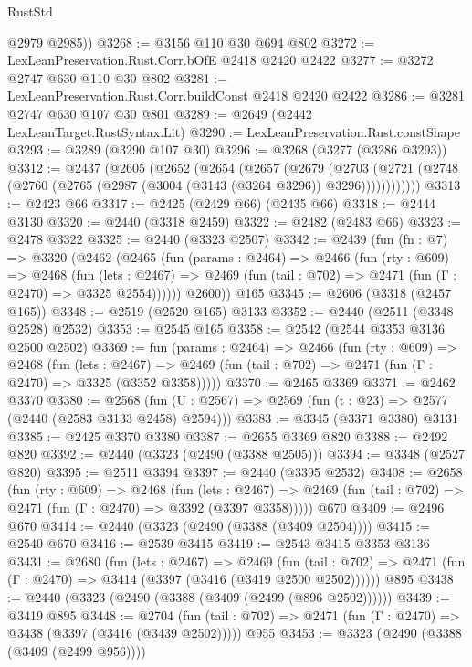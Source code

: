 \begin{lexlean}{RustStd}
\begin{coremodule}
{\begin{coremodule}
{{{{{{{{{{{{        @2979
        @2985))
@3268 := @3156 @110 @30 @694 @802
@3272 := LexLeanPreservation.Rust.Corr.bOfE @2418 @2420 @2422
@3277 := @3272 @2747 @630 @110 @30 @802
@3281 := LexLeanPreservation.Rust.Corr.buildConst @2418 @2420 @2422
@3286 := @3281 @2747 @630 @107 @30 @801
@3289 := @2649 (@2442 LexLeanTarget.RustSyntax.Lit)
@3290 := LexLeanPreservation.Rust.constShape
@3293 := @3289 (@3290 @107 @30)
@3296 := @3268 (@3277 (@3286 @3293))
@3312 := @2437
    (@2605
      (@2652
        (@2654
          (@2657
            (@2679
              (@2703
                (@2721 (@2748 (@2760 (@2765 (@2987 (@3004 (@3143 (@3264 @3296)) @3296))))))))))))
@3313 := @2423 @66
@3317 := @2425 (@2429 @66) (@2435 @66)
@3318 := @2444 @3130
@3320 := @2440 (@3318 @2459)
@3322 := @2482 (@2483 @66)
@3323 := @2478 @3322
@3325 := @2440 (@3323 @2507)
@3342 := @2439
    (fun (fn : @7) =>
    @3320
      (@2462
        (@2465
          (fun (params : @2464) =>
          @2466
            (fun (rty : @609) =>
            @2468
              (fun (lets : @2467) =>
              @2469 (fun (tail : @702) => @2471 (fun (Γ : @2470) => @3325 @2554))))))
        @2600))
    @165
@3345 := @2606 (@3318 (@2457 @165))
@3348 := @2519 (@2520 @165) @3133
@3352 := @2440 (@2511 (@3348 @2528) @2532)
@3353 := @2545 @165
@3358 := @2542 (@2544 @3353 @3136 @2500 @2502)
@3369 := fun (params : @2464) =>
  @2466
    (fun (rty : @609) =>
    @2468
      (fun (lets : @2467) =>
      @2469 (fun (tail : @702) => @2471 (fun (Γ : @2470) => @3325 (@3352 @3358)))))
@3370 := @2465 @3369
@3371 := @2462 @3370
@3380 := @2568 (fun (U : @2567) => @2569 (fun (t : @23) => @2577 (@2440 (@2583 @3133 @2458) @2594)))
@3383 := @3345 (@3371 @3380) @3131
@3385 := @2425 @3370 @3380
@3387 := @2655 @3369 @820
@3388 := @2492 @820
@3392 := @2440 (@3323 (@2490 (@3388 @2505)))
@3394 := @3348 (@2527 @820)
@3395 := @2511 @3394
@3397 := @2440 (@3395 @2532)
@3408 := @2658
    (fun (rty : @609) =>
    @2468
      (fun (lets : @2467) =>
      @2469 (fun (tail : @702) => @2471 (fun (Γ : @2470) => @3392 (@3397 @3358)))))
    @670
@3409 := @2496 @670
@3414 := @2440 (@3323 (@2490 (@3388 (@3409 @2504))))
@3415 := @2540 @670
@3416 := @2539 @3415
@3419 := @2543 @3415 @3353 @3136
@3431 := @2680
    (fun (lets : @2467) =>
    @2469
      (fun (tail : @702) => @2471 (fun (Γ : @2470) => @3414 (@3397 (@3416 (@3419 @2500 @2502))))))
    @895
@3438 := @2440 (@3323 (@2490 (@3388 (@3409 (@2499 (@896 @2502))))))
@3439 := @3419 @895
@3448 := @2704
    (fun (tail : @702) => @2471 (fun (Γ : @2470) => @3438 (@3397 (@3416 (@3439 @2502)))))
    @955
@3453 := @3323 (@2490 (@3388 (@3409 (@2499 @956))))
}}}}}}}}}}}}
\end{coremodule}}
\end{coremodule}
\end{lexlean}
